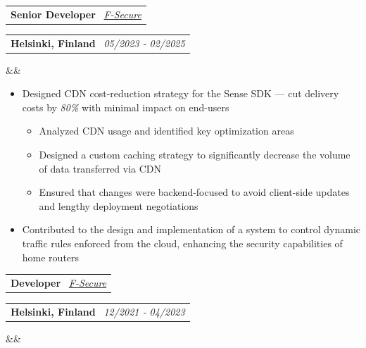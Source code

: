 \documentclass[11pt,a4paper,sans]{moderncv}
\makeatletter
\newcommand*{\customcventry}[7][.13em]{
\begin{tabular}{@{}l}
{\bfseries #4} \
{\itshape #3}
\end{tabular}
\hfill
\begin{tabular}{l@{}}
{\bfseries #5} \
{\itshape #2}
\end{tabular}
\ifx&#7&%
\else{\
\begin{minipage}{\maincolumnwidth}%
\small#7%
\end{minipage}}\fi%
\par\addvspace{#1}}
\makeatother
\begin{document}
\customcventry
{05/2023 ‐ 02/2025}
{{\color{blue}\href{https://www.f-secure.com/}{F-Secure}}}
{Senior Developer}
{Helsinki, Finland}
{}
{}

\begin{itemize}[leftmargin=0.6cm, label={\textbullet}]
    \item Designed CDN cost-reduction strategy for the Sense SDK --- cut delivery costs by \emph{80\%} with minimal impact on end-users
        \begin{itemize}
            \item Analyzed CDN usage and identified key optimization areas
            \item Designed a custom caching strategy to significantly decrease the volume of data transferred via CDN
            \item Ensured that changes were backend-focused to avoid client-side updates and lengthy deployment negotiations
        \end{itemize}
    \item Contributed to the design and implementation of a system to control dynamic traffic rules enforced from the cloud, enhancing the security capabilities of home routers
\end{itemize}

\customcventry
{12/2021 ‐ 04/2023}
{{\color{blue}\href{https://www.f-secure.com/}{F-Secure}}}
{Developer}
{Helsinki, Finland}
{}
{}
\end{document}
